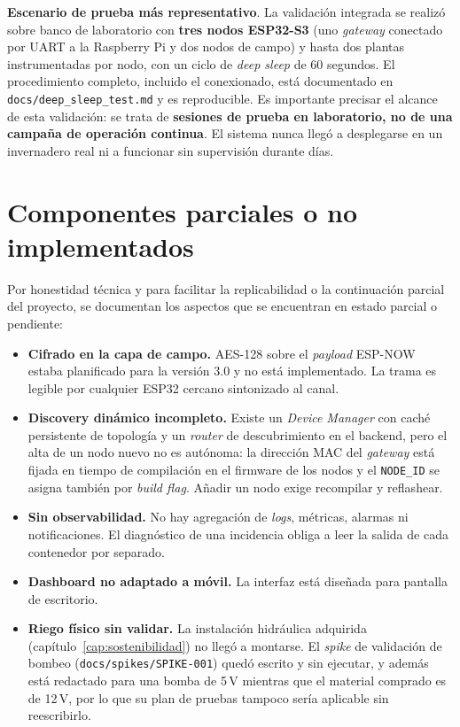 \textbf{Escenario de prueba m\'as representativo}. La validaci\'on
integrada se realiz\'o sobre banco de laboratorio con \textbf{tres nodos
ESP32-S3} (uno \textit{gateway} conectado por UART a la Raspberry Pi y
dos nodos de campo) y hasta dos plantas instrumentadas por nodo, con un
ciclo de \textit{deep sleep} de 60 segundos. El procedimiento completo,
incluido el conexionado, est\'a documentado en
\texttt{docs/deep\_sleep\_test.md} y es reproducible. Es importante
precisar el alcance de esta validaci\'on: se trata de \textbf{sesiones de
prueba en laboratorio, no de una campa\~na de operaci\'on continua}. El
sistema nunca lleg\'o a desplegarse en un invernadero real ni a
funcionar sin supervisi\'on durante d\'ias.

\section{Componentes parciales o no implementados}

Por honestidad t\'ecnica y para facilitar la replicabilidad o la
continuaci\'on parcial del proyecto, se documentan los aspectos que se
encuentran en estado parcial o pendiente:

\begin{itemize}[leftmargin=*]
    \item \textbf{Cifrado en la capa de campo.} AES-128 sobre el
    \textit{payload} ESP-NOW estaba planificado para la versi\'on 3.0 y
    no est\'a implementado. La trama es legible por cualquier ESP32
    cercano sintonizado al canal.
    \item \textbf{Discovery din\'amico incompleto.} Existe un
    \textit{Device Manager} con cach\'e persistente de topolog\'ia y un
    \textit{router} de descubrimiento en el backend, pero el alta de un
    nodo nuevo no es aut\'onoma: la direcci\'on MAC del \textit{gateway}
    est\'a fijada en tiempo de compilaci\'on en el firmware de los nodos y
    el \texttt{NODE\_ID} se asigna tambi\'en por \textit{build flag}.
    A\~nadir un nodo exige recompilar y reflashear.
    \item \textbf{Sin observabilidad.} No hay agregaci\'on de
    \textit{logs}, m\'etricas, alarmas ni notificaciones. El diagn\'ostico
    de una incidencia obliga a leer la salida de cada contenedor por
    separado.
    \item \textbf{Dashboard no adaptado a m\'ovil.} La interfaz est\'a
    dise\~nada para pantalla de escritorio.
    \item \textbf{Riego f\'isico sin validar.} La instalaci\'on
    hidr\'aulica adquirida (cap\'itulo~\ref{cap:sostenibilidad}) no lleg\'o
    a montarse. El \textit{spike} de validaci\'on de bombeo
    (\texttt{docs/spikes/SPIKE-001}) qued\'o escrito y sin ejecutar, y
    adem\'as est\'a redactado para una bomba de 5\,V mientras que el
    material comprado es de 12\,V, por lo que su plan de pruebas
    tampoco ser\'ia aplicable sin reescribirlo.
\end{itemize}

